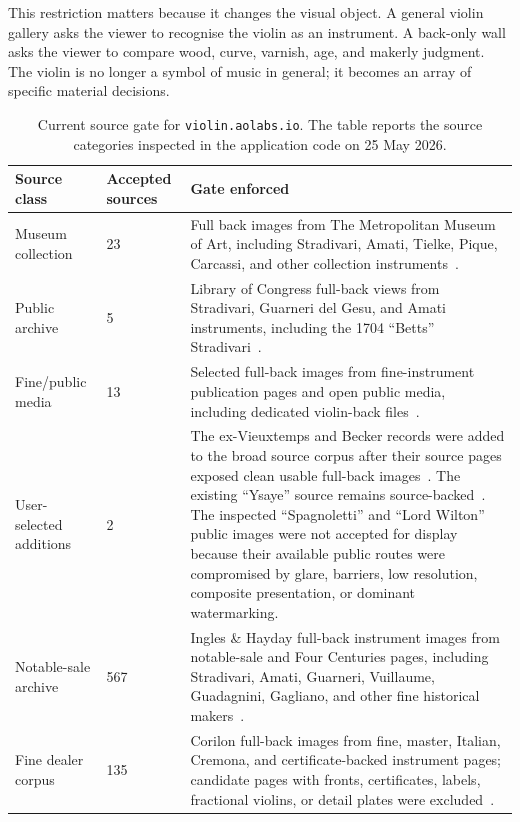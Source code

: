 \documentclass[12pt,letterpaper]{article}
\begin{document}
This restriction matters because it changes the visual object. A general violin gallery asks the viewer to recognise the violin as an instrument. A back-only wall asks the viewer to compare wood, curve, varnish, age, and makerly judgment. The violin is no longer a symbol of music in general; it becomes an array of specific material decisions.

\begin{table}[H]
    \centering
    \caption{Current source gate for \texttt{violin.aolabs.io}. The table reports the source categories inspected in the application code on 25 May 2026.}
    \label{tab:source_gate}
    \begin{tabular}{p{}p{}p{}}
        \toprule
        Source class & Accepted sources & Gate enforced \\
        \midrule
        Museum collection & 23 & Full back images from The Metropolitan Museum of Art, including Stradivari, Amati, Tielke, Pique, Carcassi, and other collection instruments~\cite{met_gould_1693}. \\
        Public archive & 5 & Library of Congress full-back views from Stradivari, Guarneri del Gesu, and Amati instruments, including the 1704 ``Betts'' Stradivari~\cite{loc_betts_1704}. \\
        Fine/public media & 13 & Selected full-back images from fine-instrument publication pages and open public media, including dedicated violin-back files~\cite{commons_violin_backs}. \\
        User-selected additions & 2 & The ex-Vieuxtemps and Becker records were added to the broad source corpus after their source pages exposed clean usable full-back images~\cite{darnton_vieuxtemps_1710,shar_becker_1940}. The existing ``Ysaye'' source remains source-backed~\cite{strings_ysaye_1740}. The inspected ``Spagnoletti'' and ``Lord Wilton'' public images were not accepted for display because their available public routes were compromised by glare, barriers, low resolution, composite presentation, or dominant watermarking. \\
        Notable-sale archive & 567 & Ingles \& Hayday full-back instrument images from notable-sale and Four Centuries pages, including Stradivari, Amati, Guarneri, Vuillaume, Guadagnini, Gagliano, and other fine historical makers~\cite{ingles_four_centuries}. \\
        Fine dealer corpus & 135 & Corilon full-back images from fine, master, Italian, Cremona, and certificate-backed instrument pages; candidate pages with fronts, certificates, labels, fractional violins, or detail plates were excluded~\cite{corilon_violins}. \\

\end{tabular}
\end{table}
\end{document}
